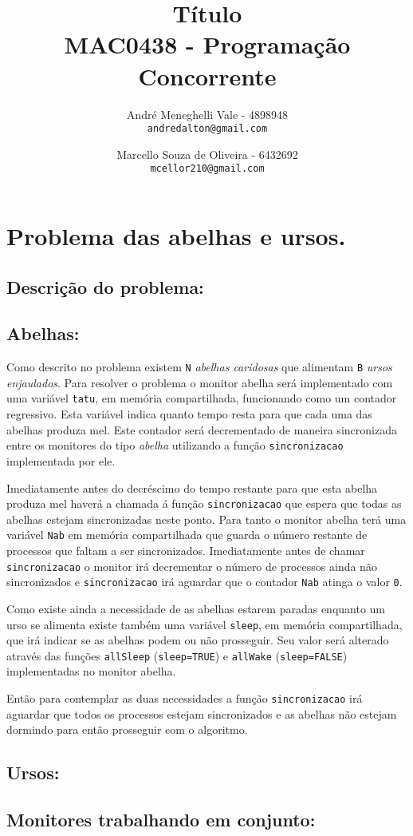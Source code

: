 \documentclass[12pt,a4paper]{article}
\title{Título\\MAC0438 - Programação Concorrente}
\author{
    André Meneghelli Vale - 4898948\\
    \texttt{andredalton@gmail.com}
    \and
    Marcello Souza de Oliveira - 6432692\\
    \texttt{mcellor210@gmail.com}
}
\date{}
\begin{document}
\maketitle

\newpage

\section{Problema das abelhas e ursos.}

\subsection{Descrição do problema:}

\subsection{Abelhas:}

Como descrito no problema existem \verb+N+ \emph{abelhas caridosas} que alimentam \verb+B+ \emph{ursos enjaulados}. Para resolver o problema o monitor abelha será implementado com uma variável \verb+tatu+, em memória compartilhada, funcionando como um contador regressivo. Esta variável indica quanto tempo resta para que cada uma das abelhas produza mel. Este contador será decrementado de maneira sincronizada entre os monitores do tipo \emph{abelha} utilizando a função \verb+sincronizacao+ implementada por ele.

Imediatamente antes do decréscimo do tempo restante para que esta abelha produza mel haverá a chamada á função \verb+sincronizacao+ que espera que todas as abelhas estejam sincronizadas neste ponto. Para tanto o monitor abelha terá uma variável \verb+Nab+ em memória compartilhada que guarda o número restante de processos que faltam a ser sincronizados. Imediatamente antes de chamar \verb+sincronizacao+ o monitor irá decrementar o número de processos ainda não sincronizados e \verb+sincronizacao+ irá aguardar que o contador \verb+Nab+ atinga o valor \verb+0+.

Como existe ainda a necessidade de as abelhas estarem paradas enquanto um urso se alimenta existe também uma variável \verb+sleep+, em memória compartilhada, que irá indicar se as abelhas podem ou não prosseguir. Seu valor será alterado através das funções \verb+allSleep+ (\verb+sleep=TRUE+) e \verb+allWake+ (\verb+sleep=FALSE+) implementadas no monitor abelha.

Então para contemplar as duas necessidades a função \verb+sincronizacao+ irá aguardar que todos os processos estejam sincronizados e as abelhas não estejam dormindo para então prosseguir com o algoritmo.

\subsection{Ursos:}

\subsection{Monitores trabalhando em conjunto:}
\end{document}
